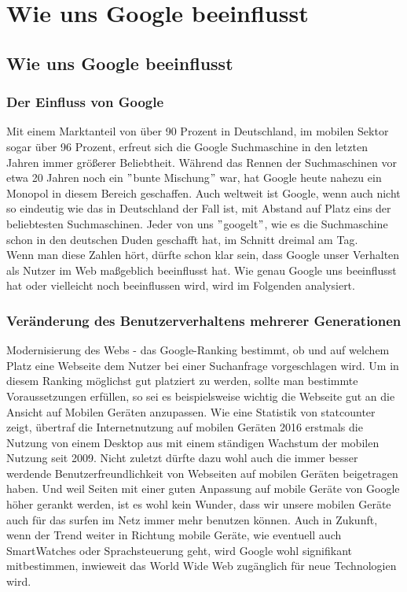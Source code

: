 \chapter{Wie uns Google beeinflusst}\label{ch:wie-uns-google-beeinflusst}


\section{Wie uns Google beeinflusst}\label{sec:wie-uns-google-beeinflusst}

\subsection{Der Einfluss von Google}\label{subsec:der-einfluss-von-google}
Mit einem Marktanteil von über 90 Prozent in Deutschland, im mobilen Sektor sogar über 96 Prozent, erfreut sich die Google Suchmaschine in den letzten Jahren immer größerer Beliebtheit.
Während das Rennen der Suchmaschinen vor etwa 20 Jahren noch ein \("\)bunte Mischung\("\) war, hat Google heute nahezu ein Monopol in diesem Bereich geschaffen.
Auch weltweit ist Google, wenn auch nicht so eindeutig wie das in Deutschland der Fall ist, mit Abstand auf Platz eins der beliebtesten Suchmaschinen.
Jeder von uns \("\)googelt\("\)\cite{DUD22}, wie es die Suchmaschine schon in den deutschen Duden geschafft hat, im Schnitt dreimal am Tag.\cite{DOL22}\\
Wenn man diese Zahlen hört, dürfte schon klar sein, dass Google unser Verhalten als Nutzer im Web maßgeblich beeinflusst hat.
Wie genau Google uns beeinflusst hat oder vielleicht noch beeinflussen wird, wird im Folgenden analysiert.

\subsection{Veränderung des Benutzerverhaltens mehrerer Generationen}\label{subsec:veränderung-des-benutzerverhaltens-mehrerer-generationen}
Modernisierung des Webs - das Google-Ranking bestimmt, ob und auf welchem Platz eine Webseite dem Nutzer bei einer Suchanfrage vorgeschlagen wird.
Um in diesem Ranking möglichst gut platziert zu werden, sollte man bestimmte Voraussetzungen erfüllen, so sei es beispielsweise wichtig die Webseite gut an die Ansicht auf Mobilen Geräten anzupassen.\cite{BUI22}
Wie eine Statistik von statcounter zeigt, übertraf die Internetnutzung auf mobilen Geräten 2016 erstmals die Nutzung von einem Desktop aus mit einem ständigen Wachstum der mobilen Nutzung seit 2009.\cite{STA16}
Nicht zuletzt dürfte dazu wohl auch die immer besser werdende Benutzerfreundlichkeit von Webseiten auf mobilen Geräten beigetragen haben.
Und weil Seiten mit einer guten Anpassung auf mobile Geräte von Google höher gerankt werden, ist es wohl kein Wunder, dass wir unsere mobilen Geräte auch für das surfen im Netz immer mehr benutzen können.
Auch in Zukunft, wenn der Trend weiter in Richtung mobile Geräte, wie eventuell auch SmartWatches oder Sprachsteuerung geht, wird Google wohl signifikant mitbestimmen, inwieweit das World Wide Web zugänglich für neue Technologien wird.\\

